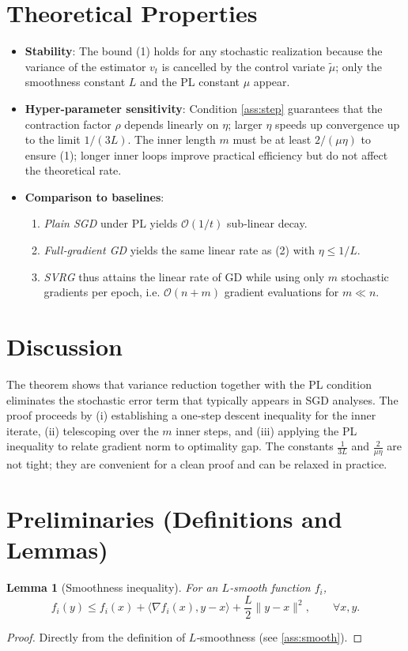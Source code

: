 \documentclass{article}
\newtheorem{lemma}{Lemma}
\begin{document}
\section*{Theoretical Properties}
\begin{itemize}
\item \textbf{Stability}: The bound (1) holds for any stochastic realization because the variance of the estimator $v_t$ is cancelled by the control variate $\tilde{\mu}$; only the smoothness constant $L$ and the PL constant $\mu$ appear.
\item \textbf{Hyper‑parameter sensitivity}: Condition \ref{ass:step} guarantees that the contraction factor $\rho$ depends linearly on $\eta$; larger $\eta$ speeds up convergence up to the limit $1/(3L)$. The inner length $m$ must be at least $2/(\mu\eta)$ to ensure (1); longer inner loops improve practical efficiency but do not affect the theoretical rate.
\item \textbf{Comparison to baselines}:
    \begin{enumerate}
        \item \emph{Plain SGD} under PL yields $\mathcal{O}(1/t)$ sub‑linear decay.
        \item \emph{Full‑gradient GD} yields the same linear rate as (2) with $\eta\le 1/L$.
        \item \emph{SVRG} thus attains the linear rate of GD while using only $m$ stochastic gradients per epoch, i.e. $\mathcal{O}(n+m)$ gradient evaluations for $m\ll n$.
    \end{enumerate}
\end{itemize}

\section*{Discussion}
The theorem shows that variance reduction together with the PL condition eliminates the stochastic error term that typically appears in SGD analyses. The proof proceeds by (i) establishing a one‑step descent inequality for the inner iterate, (ii) telescoping over the $m$ inner steps, and (iii) applying the PL inequality to relate gradient norm to optimality gap. The constants $\frac{1}{3L}$ and $\frac{2}{\mu\eta}$ are not tight; they are convenient for a clean proof and can be relaxed in practice.

\newpage
\section*{Preliminaries (Definitions and Lemmas)}
\begin{lemma}[Smoothness inequality]\label{lem:smooth}
For an $L$‑smooth function $f_i$,
\[
f_i(y)\le f_i(x)+\langle\nabla f_i(x),y-x\rangle+\frac{L}{2}\|y-x\|^{2},\qquad\forall x,y.
\tag{L1}
\]
\end{lemma}
\begin{proof}
Directly from the definition of $L$‑smoothness (see \ref{ass:smooth}). \qedhere
\end{proof}
\end{document}
